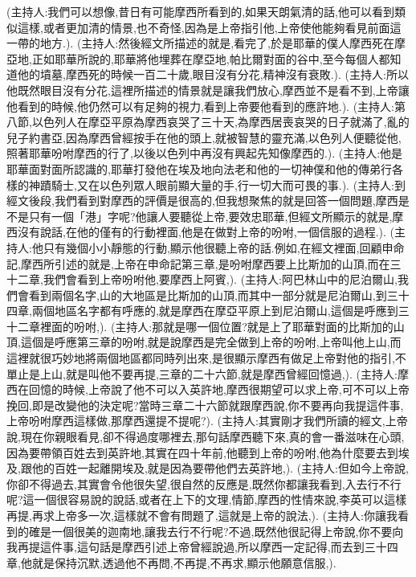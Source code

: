 \documentclass{book}
\begin{document}
(主持人:我們可以想像,昔日有可能摩西所看到的,如果天朗氣清的話,他可以看到類似這樣,或者更加清的情景,也不奇怪,因為是上帝指引他,上帝使他能夠看見前面這一帶的地方.).
(主持人:然後經文所描述的就是,看完了,於是耶華的僕人摩西死在摩亞地,正如耶華所說的,耶華將他埋葬在摩亞地,帕比爾對面的谷中,至今每個人都知道他的墳墓,摩西死的時候一百二十歲,眼目沒有分花,精神沒有衰敗.).
(主持人:所以他既然眼目沒有分花,這裡所描述的情景就是讓我們放心,摩西並不是看不到,上帝讓他看到的時候,他仍然可以有足夠的視力,看到上帝要他看到的應許地.).
(主持人:第八節,以色列人在摩亞平原為摩西哀哭了三十天,為摩西居喪哀哭的日子就滿了,亂的兒子約書亞,因為摩西曾經按手在他的頭上,就被智慧的靈充滿,以色列人便聽從他,照著耶華吩咐摩西的行了,以後以色列中再沒有興起先知像摩西的.).
(主持人:他是耶華面對面所認識的,耶華打發他在埃及地向法老和他的一切神僕和他的傳弟行各樣的神蹟騎士,又在以色列眾人眼前顯大量的手,行一切大而可畏的事.).
(主持人:到經文後段,我們看到對摩西的評價是很高的,但我想聚焦的就是回答一個問題,摩西是不是只有一個「港」字呢?他讓人要聽從上帝,要效忠耶華,但經文所顯示的就是,摩西沒有說話,在他的僅有的行動裡面,他是在做對上帝的吩咐,一個信服的過程.).
(主持人:他只有幾個小小靜態的行動,顯示他很聽上帝的話.例如,在經文裡面,回顧申命記,摩西所引述的就是,上帝在申命記第三章,是吩咐摩西要上比斯加的山頂,而在三十二章,我們會看到上帝吩咐他,要摩西上阿賓,).
(主持人:阿巴林山中的尼泊爾山,我們會看到兩個名字,山的大地區是比斯加的山頂,而其中一部分就是尼泊爾山,到三十四章,兩個地區名字都有呼應的,就是摩西在摩亞平原上到尼泊爾山,這個是呼應到三十二章裡面的吩咐,).
(主持人:那就是哪一個位置?就是上了耶華對面的比斯加的山頂,這個是呼應第三章的吩咐,就是說摩西是完全做到上帝的吩咐,上帝叫他上山,而這裡就很巧妙地將兩個地區都同時列出來,是很顯示摩西有做足上帝對他的指引,不單止是上山,就是叫他不要再提,三章的二十六節,就是摩西曾經回憶過,).
(主持人:摩西在回憶的時候,上帝說了他不可以入英許地,摩西很期望可以求上帝,可不可以上帝挽回,即是改變他的決定呢?當時三章二十六節就跟摩西說,你不要再向我提這件事,上帝吩咐摩西這樣做,那摩西還提不提呢?).
(主持人:其實剛才我們所讀的經文,上帝說,現在你親眼看見,卻不得過度哪裡去,那句話摩西聽下來,真的會一番滋味在心頭,因為要帶領百姓去到英許地,其實在四十年前,他聽到上帝的吩咐,他為什麼要去到埃及,跟他的百姓一起離開埃及,就是因為要帶他們去英許地,).
(主持人:但如今上帝說,你卻不得過去,其實會令他很失望,很自然的反應是,既然你都讓我看到,入去行不行呢?這一個很容易說的說話,或者在上下的文理,情節,摩西的性情來說,李英可以這樣再提,再求上帝多一次,這樣就不會有問題了,這就是上帝的說法,).
(主持人:你讓我看到的確是一個很美的迦南地,讓我去行不行呢?不過,既然他很記得上帝說,你不要向我再提這件事,這句話是摩西引述上帝曾經說過,所以摩西一定記得,而去到三十四章,他就是保持沉默,透過他不再問,不再提,不再求,顯示他願意信服,).
\end{document}
